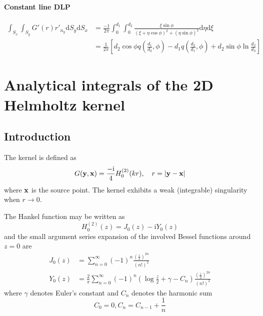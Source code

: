 \documentclass[a4paper,11pt]{article}
\newcommand{\td}{\mathrm{d}}
\newcommand{\ti}{\mathrm{i}}
\begin{document}
\paragraph{Constant line DLP}

\begin{align}
\int_{S_{x}} \int_{S_{y}} G'(r) r'_{n_{y}} \td S_y \td S_x
&=
\frac{-1}{2\pi}\int_{0}^{d_1} \int_{0}^{d_2}
\frac{\xi\sin\phi}{(\xi+\eta \cos\phi)^2 + (\eta\sin\phi)^2}
\td \eta \td \xi \nonumber \\
&=
\frac{1}{2\pi}\left[
	d_2 \cos\phi q\left(\frac{d_1}{d_2}, \phi\right)
	- d_1 q\left(\frac{d_2}{d_1}, \phi\right)
	+ d_2 \sin\phi \ln \frac{d_2}{d_3}
\right]
\end{align}



\section {Analytical integrals of the 2D Helmholtz kernel}

\subsection{Introduction}

The kernel is defined as
%
\begin{equation}
	G({\bf y}, {\bf x}) = \frac{-\ti}{4} H_0^{(2)}(kr), \quad r = |{\bf y} - {\bf x}|
\end{equation}
%
where ${\bf x}$ is the source point. The kernel exhibits a weak (integrable) singularity when $r \to 0$.

The Hankel function may be written as
%
\begin{equation}
	H_0^{(2)}(z) = J_0(z) - \ti Y_0(z)
\end{equation}
%
and the small argument series expansion of the involved Bessel functions around $z=0$ are
%
\begin{align}
	J_0(z) &= \sum_{n=0}^{\infty} (-1)^n \frac{\left(\frac{z}{2}\right)^{2n}}{\left(n!\right)^2} \\
	Y_0(z) &= \frac{2}{\pi}
	\sum_{n=0}^{\infty} (-1)^n \left(\log \frac{z}{2} + \gamma - C_n \right) \frac{\left(\frac{z}{2}\right)^{2n}}{\left(n!\right)^2}
\end{align}
%
where $\gamma$ denotes Euler's constant and $C_n$ denotes the harmonic sum
%
\begin{equation}
	C_0 = 0, C_n = C_{n-1} + \frac{1}{n}
\end{equation}
\end{document}
